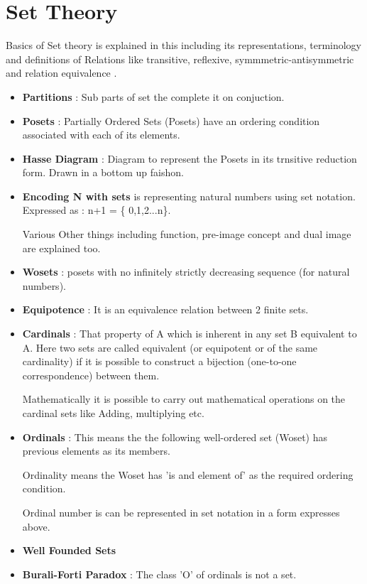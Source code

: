 \chapter{Set Theory}

Basics of Set theory is explained in this including its representations, terminology and definitions of Relations like transitive, reflexive, symmmetric-antisymmetric and relation equivalence .

\begin{itemize}
	
	\item{\textbf{Partitions} : Sub parts of set the complete it on conjuction.
	}

	\item{\textbf{Posets} : Partially Ordered Sets (Posets) have an ordering condition associated with each of its elements.
	}

	\item{\textbf{Hasse Diagram} : Diagram to represent the Posets in its trnsitive reduction form. Drawn in a bottom up faishon.
	}

	\item{\textbf{Encoding N with sets} is representing natural numbers using set notation. Expressed as : n+1 = \{ 0,1,2...n\}. 
	}
	
	Various Other things including function, pre-image concept and dual image  are explained too.

	\item{\textbf{Wosets} : posets with no infinitely strictly decreasing sequence (for natural numbers).
	}

	\item{\textbf{Equipotence} : It is an equivalence relation between 2 finite sets.
	}

	\item{\textbf{Cardinals} : That property of A which is inherent in any set B equivalent to A. Here two sets are called equivalent (or equipotent or of the same cardinality) if it is possible to construct a bijection (one-to-one correspondence) between them. 

	Mathematically it is possible to carry out mathematical operations on the cardinal sets like Adding, multiplying etc.

	}

	\item{\textbf{Ordinals} : This means the the following well-ordered set (Woset) has previous elements as its members.

	Ordinality means the Woset has 'is and element of' as the required ordering condition.

	Ordinal number is can be represented in set notation in a form expresses above.
	}

	\item{\textbf{Well Founded Sets}}

	\item{\textbf{Burali-Forti Paradox} : 
	The class 'O' of ordinals is not a set.
	}
\end{itemize}
